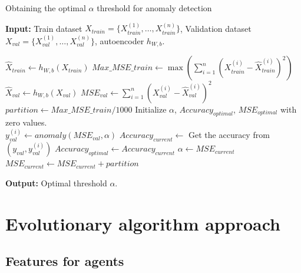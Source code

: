 \documentclass{iosart2c}
\begin{document}
\begin{algorithm}
\caption{Obtaining the optimal $\alpha$ threshold for anomaly detection}\label{obtener_umbral}
\textbf{Input:} Train dataset $X_{train}=\{X_{train}^{(1)},\ldots,X_{train}^{(n)}\}$, Validation dataset $X_{val}=\{X_{val}^{(1)},\ldots,X_{val}^{(n)}\}$, autoencoder $h_{W,b}$.\\

\begin{algorithmic}
\State $\hat{X}_{train} \xleftarrow{} h_{W,b}(X_{train})$ 
\State $Max\_MSE\_{train}\xleftarrow{}\max\left(\sum_{i=1}^n\left(X_{train}^{(i)}-\hat{X}_{train}^{(i)}\right)^2\right)$ 
\State $\hat{X}_{val} \xleftarrow{} h_{W,b}(X_{val})$ 
\State $MSE_{val}\xleftarrow{}\sum_{i=1}^n\left(X_{val}^{(i)}-\hat{X}_{val}^{(i)}\right)^2$ 
\State $partition\xleftarrow{} Max\_MSE\_{train}/1000$
\State Initialize $\alpha$, $Accuracy_{optimal}$, $MSE_{optimal}$ with zero values.\\



 
    \State $y_{val}^{(i)}\xleftarrow{}anomaly(MSE_{val},\alpha)$
    \State $Accuracy_{current}\xleftarrow{}$ Get the accuracy from $(y_{val},y_{val}^{(i)})$
            \State $Accuracy_{optimal}\xleftarrow{}Accuracy_{current}$
            \State $\alpha\xleftarrow{}MSE_{current}$
        \EndIf
    \State $MSE_{current}\xleftarrow{}MSE_{current}+partition$
\EndFor\\
\end{algorithmic}
\textbf{Output:} Optimal threshold $\alpha$.\\
\end{algorithm}


\newpage



\section{Evolutionary algorithm approach}

\subsection{Features for agents}\label{variables}
\end{document}
